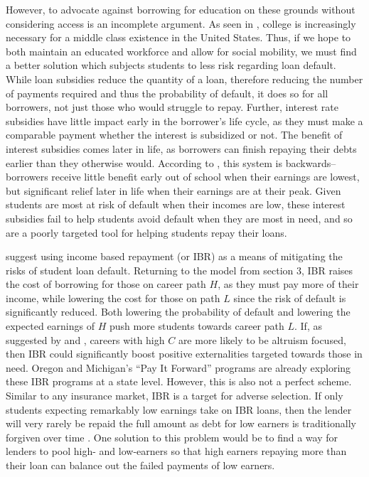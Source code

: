 \documentclass[12pt]{article}
\begin{document}
	However, to advocate against borrowing for education on these grounds without considering access is an incomplete argument. As seen in \textcite{abel2014}, college is increasingly necessary for a middle class existence in the United States. Thus, if we hope to both maintain an educated workforce and allow for social mobility, we must find a better solution which subjects students to less risk regarding loan default. While loan subsidies reduce the quantity of a loan, therefore reducing the number of payments required and thus the probability of default, it does so for all borrowers, not just those who would struggle to repay. Further, interest rate subsidies have little impact early in the borrower's life cycle, as they must make a comparable payment whether the interest is subsidized or not. The benefit of interest subsidies comes later in life, as borrowers can finish repaying their debts earlier than they otherwise would. According to \textcite{dynarski2015}, this system is backwards--borrowers receive little benefit early out of school when their earnings are lowest, but significant relief later in life when their earnings are at their peak. Given students are most at risk of default when their incomes are low, these interest subsidies fail to help students avoid default when they are most in need, and so are a poorly targeted tool for helping students repay their loans. 
	
	\textcite{abraham2018} suggest using income based repayment (or IBR) as a means of mitigating the risks of student loan default. Returning to the model from section 3, IBR raises the cost of borrowing for those on career path $H$, as they must pay more of their income, while lowering the cost for those on path $L$ since the risk of default is significantly reduced. Both lowering the probability of default and lowering the expected earnings of $H$ push more students towards career path $L$. If, as suggested by \textcite{benshem1991} and \textcite{hanson1995}, careers with high $C$ are more likely to be altruism focused, then IBR could significantly boost positive externalities targeted towards those in need.  Oregon and Michigan's ``Pay It Forward'' programs are already exploring these IBR programs at a state level. However, this is also not a perfect scheme. Similar to any insurance market, IBR is a target for adverse selection. If only students expecting remarkably low earnings take on IBR loans, then the lender will very rarely be repaid the full amount as debt for low earners is traditionally forgiven over time \parencite{dynarski2015}. One solution to this problem would be to find a way for lenders to pool high- and low-earners so that high earners repaying more than their loan can balance out the failed payments of low earners.
	
\end{document}

